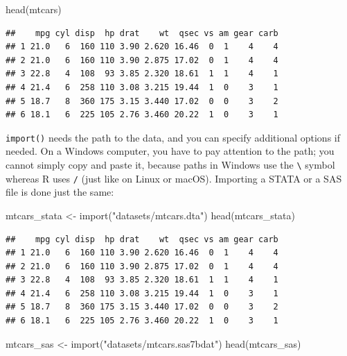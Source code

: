 \documentclass[
]{article}
\newenvironment{Shaded}{\begin{snugshade}}{\end{snugshade}}
\newcommand{\FunctionTok}[1]{\textcolor[rgb]{0.00,0.00,0.00}{#1}}
\newcommand{\NormalTok}[1]{#1}
\newcommand{\OtherTok}[1]{\textcolor[rgb]{0.56,0.35,0.01}{#1}}
\newcommand{\StringTok}[1]{\textcolor[rgb]{0.31,0.60,0.02}{#1}}
\begin{document}
\begin{Shaded}
\begin{Highlighting}[]
\FunctionTok{head}\NormalTok{(mtcars)}
\end{Highlighting}
\end{Shaded}

\begin{verbatim}
##    mpg cyl disp  hp drat    wt  qsec vs am gear carb
## 1 21.0   6  160 110 3.90 2.620 16.46  0  1    4    4
## 2 21.0   6  160 110 3.90 2.875 17.02  0  1    4    4
## 3 22.8   4  108  93 3.85 2.320 18.61  1  1    4    1
## 4 21.4   6  258 110 3.08 3.215 19.44  1  0    3    1
## 5 18.7   8  360 175 3.15 3.440 17.02  0  0    3    2
## 6 18.1   6  225 105 2.76 3.460 20.22  1  0    3    1
\end{verbatim}

\texttt{import()} needs the path to the data, and you can specify additional options if needed. On a
Windows computer, you have to pay attention to the path; you cannot simply copy and paste it, because
paths in Windows use the \texttt{\textbackslash{}} symbol whereas R uses \texttt{/} (just like on Linux or macOS).
Importing a STATA or a SAS file is done just the same:

\begin{Shaded}
\begin{Highlighting}[]
\NormalTok{mtcars\_stata }\OtherTok{\textless{}{-}} \FunctionTok{import}\NormalTok{(}\StringTok{"datasets/mtcars.dta"}\NormalTok{)}
\FunctionTok{head}\NormalTok{(mtcars\_stata)}
\end{Highlighting}
\end{Shaded}

\begin{verbatim}
##    mpg cyl disp  hp drat    wt  qsec vs am gear carb
## 1 21.0   6  160 110 3.90 2.620 16.46  0  1    4    4
## 2 21.0   6  160 110 3.90 2.875 17.02  0  1    4    4
## 3 22.8   4  108  93 3.85 2.320 18.61  1  1    4    1
## 4 21.4   6  258 110 3.08 3.215 19.44  1  0    3    1
## 5 18.7   8  360 175 3.15 3.440 17.02  0  0    3    2
## 6 18.1   6  225 105 2.76 3.460 20.22  1  0    3    1
\end{verbatim}

\begin{Shaded}
\begin{Highlighting}[]
\NormalTok{mtcars\_sas }\OtherTok{\textless{}{-}} \FunctionTok{import}\NormalTok{(}\StringTok{"datasets/mtcars.sas7bdat"}\NormalTok{)}
\FunctionTok{head}\NormalTok{(mtcars\_sas)}
\end{Highlighting}
\end{Shaded}
\end{document}
